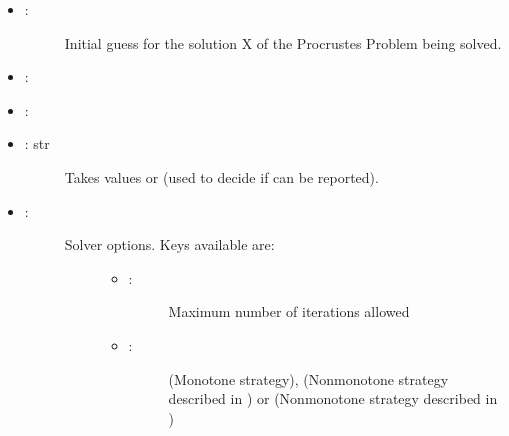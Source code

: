 \documentclass[a4paper,10pt,english]{sphinxmanual}
\begin{document}
\begin{fulllineitems}
\begin{itemize}
\begin{description}
\end{description}

\item {} \begin{description}
\item[{: }] \leavevmode
Initial guess for the solution X of the Procrustes Problem being solved.

\end{description}

\item {} 
: 

\item {} 
: 

\item {} \begin{description}
\item[{: str}] \leavevmode
Takes values  or  (used to decide if  can 
be reported).

\end{description}

\item {} \begin{description}
\item[{: }] \leavevmode\begin{description}
\item[{Solver options. Keys available are:}] \leavevmode\begin{itemize}
\item {} \begin{description}
\item[{: }] \leavevmode
Maximum number of iterations allowed

\end{description}

\item {} \begin{description}
\item[{: }] \leavevmode
{} (Monotone strategy),  (Nonmonotone strategy 
described in \label{\detokenize{skprocrustes:id16}}{\hyperref[\detokenize{skprocrustes:franbaza12}]{\sphinxcrossref{{[}FB12{]}}}}) or  (Nonmonotone strategy 
described in \label{\detokenize{skprocrustes:id17}}{\hyperref[\detokenize{skprocrustes:franbazawebe17}]{\sphinxcrossref{{[}FBM17{]}}}})


\end{description}
\end{itemize}
\end{description}
\end{description}
\end{itemize}
\end{fulllineitems}
\end{document}
